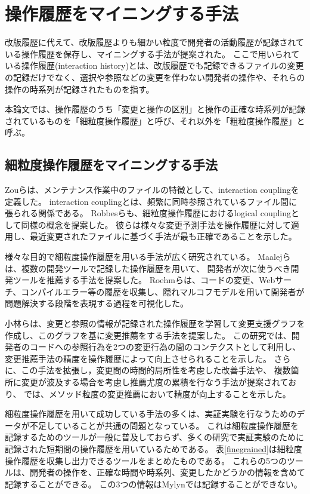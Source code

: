 \documentclass[a4paper]{jsbook}
\begin{document}
\section{操作履歴をマイニングする手法}
改版履歴に代えて、改版履歴よりも細かい粒度で開発者の活動履歴が記録されている操作履歴を保存し、マイニングする手法が提案された\cite{Hill:1992}。
ここで用いられている操作履歴(interaction history)とは、改版履歴でも記録できるファイルの変更の記録だけでなく、選択や参照などの変更を伴わない開発者の操作や、それらの操作の時系列が記録されたものを指す。

本論文では、操作履歴のうち「変更と操作の区別」と操作の正確な時系列が記録されているものを「細粒度操作履歴」と呼び、それ以外を「粗粒度操作履歴」と呼ぶ。
\subsection{細粒度操作履歴をマイニングする手法}
Zouら\cite{4268248}は、メンテナンス作業中のファイルの特徴として、interaction couplingを定義した。
interaction couplingとは、頻繁に同時参照されているファイル間に張られる関係である。
Robbesら\cite{Robbes:2008}も、細粒度操作履歴におけるlogical couplingとして同様の概念を提案した。
彼らは様々な変更予測手法を操作履歴に対して適用し、最近変更されたファイルに基づく手法が最も正確であることを示した\cite{5463278}。

様々な目的で細粒度操作履歴を用いる手法が広く研究されている。
Maalejら\cite{Maalej:2010}は、複数の開発ツールで記録した操作履歴を用いて、
開発者が次に使うべき開発ツールを推薦する手法を提案した。
Roehmらは、コードの変更、Webサーチ、コンパイルエラー等の履歴を収集し、隠れマルコフモデルを用いて開発者が問題解決する段階を表現する過程を可視化した。

小林ら\cite{6233415,KatoJapanese:2011}は、変更と参照の情報が記録された操作履歴を学習して変更支援グラフを作成し、このグラフを基に変更推薦をする手法を提案した。
この研究では、開発者のコードへの参照行為を2つの変更行為の間のコンテクストとして利用し、変更推薦手法の精度を操作履歴によって向上させられることを示した。
さらに、この手法を拡張し，変更間の時間的局所性を考慮した改善手法\cite{ss2012-76}や、
複数箇所に変更が波及する場合を考慮し推薦尤度の累積を行なう手法\cite{ss2013-84,Yamamori:2016}が提案されており、
\cite{Yamamori:2016}では、メソッド粒度の変更推薦において精度が向上することを示した。

細粒度操作履歴を用いて成功している手法の多くは、実証実験を行なうためのデータが不足していることが共通の問題となっている。
これは細粒度操作履歴を記録するためのツールが一般に普及しておらず、多くの研究で実証実験のために記録された短期間の操作履歴を用いているためである。
表\ref{finegrained}は細粒度操作履歴を収集し出力できるツールをまとめたものである。
これらの5つのツールは、開発者の操作を、正確な時間や時系列、変更したかどうかの情報を含めて記録することができる。
この3つの情報はMylynでは記録することができない。
\end{document}
